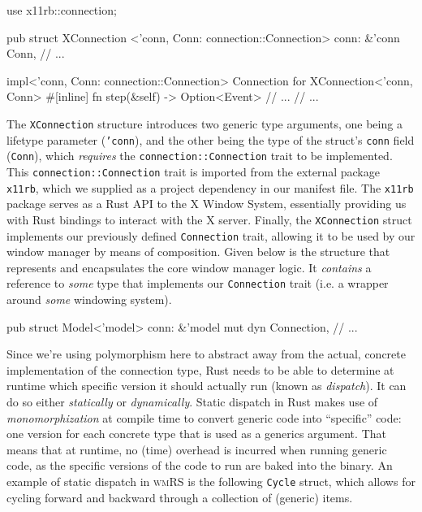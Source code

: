 \begin{rustblock}
  use x11rb::connection;
 
  pub struct XConnection
    <'conn, Conn: connection::Connection>
  {
    conn: &'conn Conn,
    // ...
  }
 
  impl<'conn, Conn: connection::Connection>
    Connection for XConnection<'conn, Conn>
  {
    #[inline]
    fn step(&self) -> Option<Event> {
      // ...
    }
    // ...
  }
\end{rustblock}

The  \texttt{XConnection}  structure  introduces  two  generic  type  arguments,
one  being   a  lifetype  parameter   (\texttt{'conn}),  and  the   other  being
the   type  of   the   struct's  \texttt{conn}   field  (\texttt{Conn}),   which
\textit{requires} the  \texttt{connection::Connection} trait to  be implemented.
This \texttt{connection::Connection} trait is imported from the external package
\texttt{x11rb}, which we supplied as a  project dependency in our manifest file.
The  \texttt{x11rb}  package serves  as  a  Rust API  to  the  X Window  System,
essentially  providing us  with Rust  bindings to  interact with  the X  server.
Finally,  the  \texttt{XConnection}  struct implements  our  previously  defined
\texttt{Connection} trait, allowing it to be used by our window manager by means
of composition.  Given below is  the structure that represents  and encapsulates
the core window manager logic. It \textit{contains} a reference to \textit{some}
type  that  implements our  \texttt{Connection}  trait  (i.e. a  wrapper  around
\textit{some} windowing system).

\begin{rustblock}
  pub struct Model<'model> {
    conn: &'model mut dyn Connection,
    // ...
  }
\end{rustblock}


Since  we're  using  polymorphism  here   to  abstract  away  from  the  actual,
concrete  implementation of  the  connection  type, Rust  needs  to  be able  to
determine  at runtime  which  specific  version it  should  actually run  (known
as  \textit{dispatch})\cite{therustbook, rustblogtraits}.  It can  do so  either
\textit{statically} or  \textit{dynamically}. Static dispatch in  Rust makes use
of  \textit{monomorphization}  at compile  time  to  convert generic  code  into
``specific'' code: one version for each concrete type that is used as a generics
argument\cite{therustbook,  rustblogtraits}.  That  means that  at  runtime,  no
(time) overhead is incurred when running  generic code, as the specific versions
of the code to run  are baked into the binary\cite{therustbook, rustblogtraits}.
An example of  static dispatch in \textsc{wmRS} is  the following \texttt{Cycle}
struct, which  allows for cycling forward  and backward through a  collection of
(generic) items.

